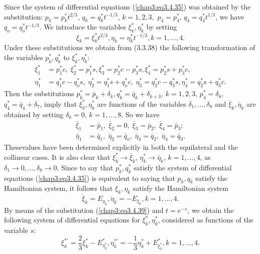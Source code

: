 Since the system of differential equations (\ref{chap3:eq3.4.35}) was
obtained by the substitution: $p_k = p^*_k t^{2/3}$, $q_k = q^*_k
t^{-1/3}$, $k = 1,2,3,$ $p_4 = p^*_4$, $q_4 = q^*_4 t^{1/3}$, we have
$q_o = q^*_o t^{-1/3}$. We introduce the variables $\xi^*_k, \eta^*_k$
by setting 
\begin{equation*}
\xi_k = \xi^*_k t^{2/3}, \eta_k = \eta^*_k t^{-1/3}, k = 1, \ldots,
4. \tag{3.4.39}\label{chap3:eq3.4.39} 
\end{equation*}
Under these substitutions we obtain from (3.3.38) the following
transformation of the variables $p^*_k, q^*_k$ to $\xi^*_k, \eta^*_k$: 
\begin{align*}
\xi^*_1 & = p^*_1 c, \; \xi^*_2  = p^*_1 s, \xi^*_3 = p^*_2 c - p^*_3 s, \xi^*_4 = p^*_2 s + p^*_3 c,\\
\eta^*_1 & = q^*_1  c - q^*_o s, \; \eta^*_2 = q^*_1 s+ q^*_o c, \;
\eta^*_3 = q^*_2 c - q^*_3 s, \eta^*_4 = q^*_2 s + q^*_3
c. \tag{3.4.40}\label{chap3:eq3.4.40} 
\end{align*}
Then the substitutions $p^*_k = \bar{p}_k + \delta_k, q^*_k =
\bar{q}_k + \delta_{k+3}$, $k =1,2,3$, $p^*_4 = \delta_8$, $q^*_4 =
\bar{q}_4 + \delta_7$, imply that $\xi^*_k, \eta^*_k$ are functions of
the variables $\delta_1, \ldots, \delta_8$ and $\bar{\xi}_k,
\bar{\eta}_k$ are obtained by setting $\delta_k = 0$, $k = 1, \ldots,
8$. So we have  
\begin{align*}
\bar{\xi}_1 & = \bar{p}_1, \; \bar{\xi}_2 = 0, \; \bar{\xi}_3 =
\bar{p}_2, \; \bar{\xi}_4 = \bar{p}_3; \\  
\bar{\eta}_1 & = \bar{q}_1, \; \bar{\eta}_2 =\bar{q}_o, \;
\bar{\eta}_3 = \bar{q}_2, \; \bar{\eta}_4 =
\bar{q}_3. \tag{3.4.41}\label{chap3:eq3.4.41} 
\end{align*}
These\pageoriginale values have been determined explicitly in both the
equilateral and the collinear cases. It is also clear that $\xi^*_k
\to \bar{\xi}_k$, $\eta^*_k \to \bar{\eta}_k$, $k = 1, \ldots, 4$, as
$\delta_1 \to 0, \ldots, \delta_8 \to 0$. Since to say that $p^*_k,
q^*_k$ satisfy the system of differential equations
(\ref{chap3:eq3.4.35}) is equivalent to saying that $p_k, q_k$ satisfy
the Hamiltonian system, it follows that $\xi_k, \eta_k$ satisfy the
Hamiltonian system 
$$
\dot{\xi}_k = E_{\eta_k}, \dot{\eta}_k = - E_{\xi_k}, k =1, \ldots, 4. 
$$
By means of the substitution (\ref{chap3:eq3.4.39}) and $t = e^{-s}$,
we obtain the following system of differential equations for $\xi^*_k,
\eta^*_k$, considered as functions of the variable $s$: 
\begin{equation*}
\xi^{*'}_k  =\frac{2}{3} \xi^*_k - E^*_{\eta^*_k}, \eta^{*'}_k =-
\frac{1}{3} \eta^*_k + E^*_{\xi^*_k}, k =1, \ldots,
4. \tag{3.4.42}\label{chap3:eq3.4.42} 
\end{equation*}
